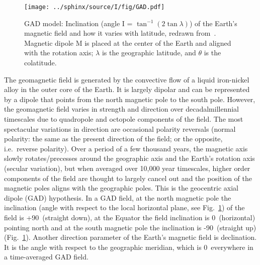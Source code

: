 \begin{figure}[!ht]
  \centering
    \texttt{[image: ../sphinx/source/I/fig/GAD.pdf]}
  \captionsetup{width=.95\textwidth}
  \caption[Geocentric axial dipole model]{GAD model: Inclination (angle I
  = $\tan^{-1}(2\tan\lambda)$) of the Earth's magnetic field and how it varies
  with latitude, redrawn from~\citet{B92,T08,T19}. Magnetic dipole M is placed
  at the center of the Earth and aligned with the rotation axis; $\lambda$ is
  the geographic latitude, and $\theta$ is the
  colatitude.}\label{Fig:chap_intro_gad}
\end{figure}

The geomagnetic field is generated by the convective flow of a liquid
iron-nickel alloy in the outer core of the Earth. It is largely dipolar and can
be represented by a dipole that points from the north magnetic pole to the south
pole. However, the geomagnetic field varies in strength and direction over
decadal\textendash{}millennial timescales due to quadropole and octopole
components of the field. The most spectacular variations in direction are
occasional polarity reversals (normal polarity: the same as the present
direction of the field; or the opposite, i.e.\ reverse polarity). Over a period
of a few thousand years, the magnetic axis slowly rotates/precesses around the
geographic axis and the Earth's rotation axis (secular variation), but when
averaged over 10,000 year timescales, higher order components of the field are
thought to largely cancel out and the position of the magnetic poles aligns with
the geographic poles. This is the geocentric axial dipole (GAD) hypothesis. In a
GAD field, at the north magnetic pole the inclination (angle with respect to the
local horizontal plane, see Fig.~\ref{Fig:chap_intro_gad}) of the field is
+90\degree\ (straight down), at the Equator the field inclination is 0\degree\
(horizontal) pointing north and at the south magnetic pole the inclination is
-90\degree\ (straight up) (Fig.~\ref{Fig:chap_intro_gad}). Another direction
parameter of the Earth's magnetic field is declination. It is the angle with
respect to the geographic meridian, which is 0\degree\ everywhere in a
time-averaged GAD field.

